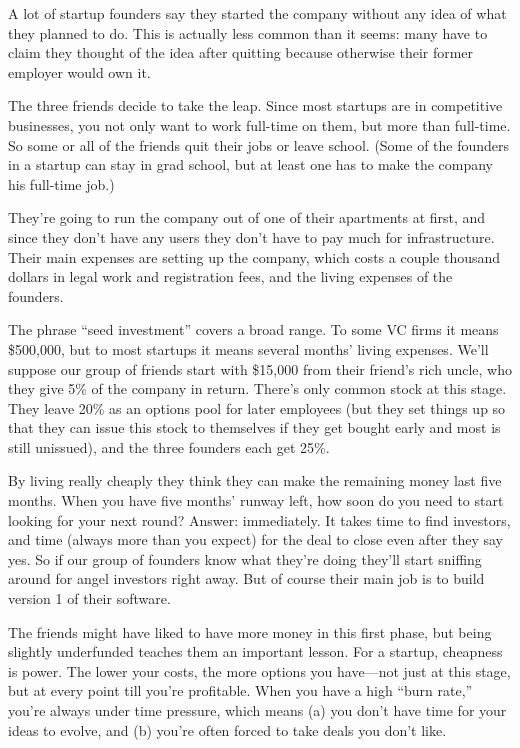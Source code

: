 \documentclass[12pt]{book}
\begin{document}
A lot of startup founders say they started the company without any idea
of what they planned to do. This is actually less common than it seems:
many have to claim they thought of the idea after quitting because
otherwise their former employer would own it.

The three friends decide to take the leap. Since most startups are in
competitive businesses, you not only want to work full-time on them, but
more than full-time. So some or all of the friends quit their jobs or
leave school. (Some of the founders in a startup can stay in grad
school, but at least one has to make the company his full-time job.)

They're going to run the company out of one of their apartments at
first, and since they don't have any users they don't have to pay much
for infrastructure. Their main expenses are setting up the company,
which costs a couple thousand dollars in legal work and registration
fees, and the living expenses of the founders.

The phrase ``seed investment'' covers a broad range. To some VC firms it
means \$500,000, but to most startups it means several months' living
expenses. We'll suppose our group of friends start with \$15,000 from
their friend's rich uncle, who they give 5\% of the company in return.
There's only common stock at this stage. They leave 20\% as an options
pool for later employees (but they set things up so that they can issue
this stock to themselves if they get bought early and most is still
unissued), and the three founders each get 25\%.

By living really cheaply they think they can make the remaining money
last five months. When you have five months' runway left, how soon do
you need to start looking for your next round? Answer: immediately. It
takes time to find investors, and time (always more than you expect) for
the deal to close even after they say yes. So if our group of founders
know what they're doing they'll start sniffing around for angel
investors right away. But of course their main job is to build version 1
of their software.

The friends might have liked to have more money in this first phase, but
being slightly underfunded teaches them an important lesson. For a
startup, cheapness is power. The lower your costs, the more options you
have---not just at this stage, but at every point till you're
profitable. When you have a high ``burn rate,'' you're always under time
pressure, which means (a) you don't have time for your ideas to evolve,
and (b) you're often forced to take deals you don't like.
\end{document}

